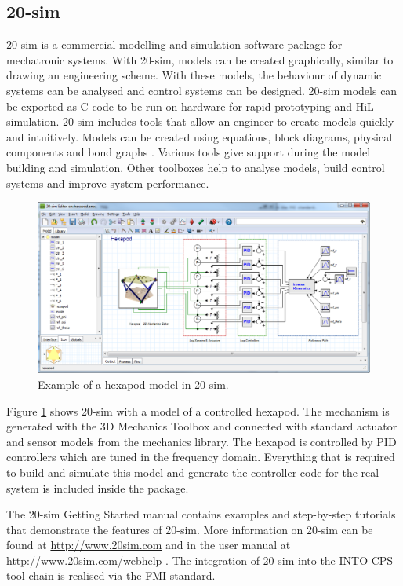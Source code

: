 \subsection{20-sim}\label{app:20sim}
{20-sim} \cite{20sim,Broenink97} is a commercial modelling and simulation software package for mechatronic systems.
%
With {20-sim}, models can be created graphically, similar to drawing an engineering scheme.
%
With these models, the behaviour of dynamic systems can be analysed and control systems can be designed.
%
{20-sim} models can be exported as C-code to be run on hardware for rapid prototyping and HiL-simulation.
%
{20-sim} includes tools that allow an engineer to create models quickly and intuitively.
%
Models can be created using equations, block diagrams, physical components and bond graphs \cite{Karnopp&68}.
%
Various tools give support during the model building and simulation.
%
Other toolboxes help to analyse models, build control systems and improve system performance.
%
%
%
\begin{figure}[hpt!]
	\centerline{\includegraphics[width=\textwidth]{figures/20-sim_hexapod_model.png}}
	\caption{Example of a hexapod model in 20-sim.}
	\label{figure:20sim_hexapod_example}
\end{figure}
%
%
%
Figure \ref{figure:20sim_hexapod_example} shows {20-sim} with a model of a controlled hexapod.
%
The mechanism is generated with the 3D Mechanics Toolbox and connected with standard actuator and sensor models from the mechanics library.
%
The hexapod is controlled by PID controllers which are tuned in the frequency domain.
%
Everything that is required to build and simulate this model and generate the controller code for the real system is included inside the package.

The {20-sim} Getting Started manual \cite{20simGettingStarted16} contains examples and step-by-step tutorials that demonstrate the features of {20-sim}.
%
More information on {20-sim} can be found at \url{http://www.20sim.com} and in the user manual at \url{http://www.20sim.com/webhelp} \cite{20simReference16a}.
%
The integration of {20-sim} into the INTO-CPS tool-chain is realised via the FMI standard.
%
%
%
